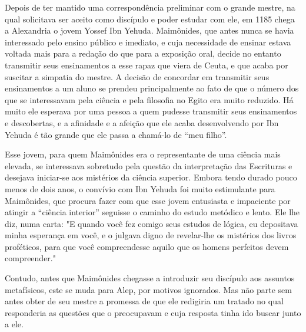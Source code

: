 Depois de ter mantido uma correspondência preliminar com o grande
mestre, na qual solicitava ser aceito como discípulo e poder estudar com
ele, em 1185 chega a Alexandria o jovem Yossef Ibn Yehuda. Maimônides,
que an­tes nunca se havia interessado pelo ensino público e imediato, e
cuja necessi­dade de ensinar estava voltada mais para a redação do que
para a exposição oral, decide no entanto transmitir seus ensinamentos a
esse rapaz que viera de Ceuta, e que acaba por suscitar a simpatia do
mestre. A decisão de concordar em transmitir seus ensinamentos a um
aluno se prendeu principalmente ao fato de que o número dos que se
interessavam pela ciência e pela filosofia no Egito era muito reduzido.
Há muito ele esperava por uma pessoa a quem pudesse trans­mitir seus
ensinamentos e descobertas, e a afinidade e a afeição que ele acaba
desenvolvendo por Ibn Yehuda é tão grande que ele passa a chamá-lo de
``meu filho''.

Esse jovem, para quem Maimônides era o representante de uma ciência mais
elevada, se interessava sobretudo pela questão da interpretação das
Escrituras e desejava iniciar-se aos mistérios da ciência superior.
Embora tendo durado pouco menos de dois anos, o convívio com Ibn Yehuda
foi muito esti­mulante para Maimônides, que procura fazer com que esse
jovem entusiasta e impaciente por atingir a ``ciência interior'' seguisse
o caminho do estudo me­tódico e lento. Ele lhe diz, numa carta: "E
quando você fez comigo seus estu­dos de lógica, eu depositava minha
esperança em você, e o julgava digno de revelar-lhe os mistérios dos
livros proféticos, para que você compreendesse aqui­lo que os homens
perfeitos devem compreender."

Contudo, antes que Maimônides chegasse a introduzir seu discípulo aos
assuntos metafísicos, este se muda para Alep, por motivos ignorados. Mas
não parte sem antes obter de seu mestre a promessa de que ele redigiria
um tratado no qual responderia as questões que o preocupavam e cuja
resposta ti­nha ido buscar junto a ele.

